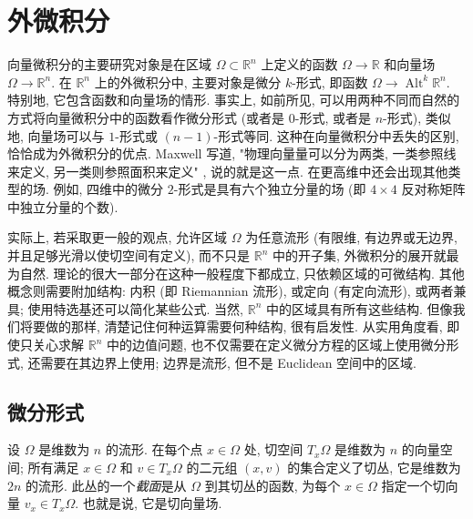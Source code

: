 \section{{外微积分}}\label{sec:exterior-calculus}

{向量微积分的主要研究对象是在区域 $\Omega\subset\mathbb R^n$ 上定义的函数 $\Omega\to\mathbb R$ 和向量场 $\Omega\to\mathbb R^n$. 在 $\mathbb R^n$ 上的外微积分中, 主要对象是微分 $k$-形式, 即函数 $\Omega\to\operatorname{Alt}^k\mathbb R^n$. 特别地, 它包含函数和向量场的情形. 事实上, 如前所见, 可以用两种不同而自然的方式将向量微积分中的函数看作微分形式 (或者是 $0$-形式, 或者是 $n$-形式), 类似地, 向量场可以与 $1$-形式或 $(n-1)$-形式等同. 这种在向量微积分中丢失的区别, 恰恰成为外微积分的优点. Maxwell 写道, "物理向量量可以分为两类, 一类参照线来定义, 另一类则参照面积来定义" , 说的就是这一点. 在更高维中还会出现其他类型的场. 例如, 四维中的微分 $2$-形式是具有六个独立分量的场 (即 $4\times4$ 反对称矩阵中独立分量的个数).}

{实际上, 若采取更一般的观点, 允许区域 $\Omega$ 为任意流形 (有限维, 有边界或无边界, 并且足够光滑以使切空间有定义), 而不只是 $\mathbb R^n$ 中的开子集, 外微积分的展开就最为自然. 理论的很大一部分在这种一般程度下都成立, 只依赖区域的可微结构. 其他概念则需要附加结构: 内积 (即 Riemannian 流形), 或定向 (有定向流形), 或两者兼具; 使用特选基还可以简化某些公式. 当然, $\mathbb R^n$ 中的区域具有所有这些结构. 但像我们将要做的那样, 清楚记住何种运算需要何种结构, 很有启发性. 从实用角度看, 即使只关心求解 $\mathbb R^n$ 中的边值问题, 也不仅需要在定义微分方程的区域上使用微分形式, 还需要在其边界上使用; 边界是流形, 但不是 Euclidean 空间中的区域.}

\subsection{{微分形式}}\label{subsec:differential-forms}

{设 $\Omega$ 是维数为 $n$ 的流形. 在每个点 $x\in\Omega$ 处, 切空间 $T_x\Omega$ 是维数为 $n$ 的向量空间; 所有满足 $x\in\Omega$ 和 $v\in T_x\Omega$ 的二元组 $(x,v)$ 的集合定义了切丛, 它是维数为 $2n$ 的流形. 此丛的一个\emph{截面}是从 $\Omega$ 到其切丛的函数, 为每个 $x\in\Omega$ 指定一个切向量 $v_x\in T_x\Omega$. 也就是说, 它是切向量场.}


